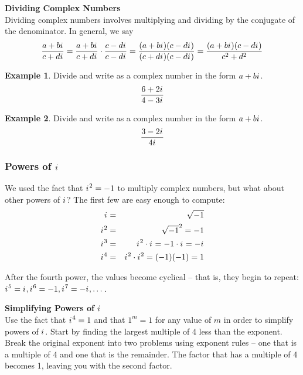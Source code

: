 \documentclass[addpoints,12pt]{exam}
\theoremstyle{definition}
\newtheorem{example}{Example}[subsection]
\newcommand{\iu}{{i\mkern1mu}}
\begin{document}
\begin{mdframed}
\textbf{Dividing Complex Numbers}\mbox{}\\
Dividing complex numbers involves multiplying and dividing by the conjugate of the denominator. In general, we say \[\dfrac{a + b\iu}{c + d\iu} = \dfrac{a + b\iu}{c + d\iu}\cdot \dfrac{c - d\iu}{c - d\iu} = \dfrac{(a+b\iu)(c-d\iu)}{(c+d\iu)(c-d\iu)} = \dfrac{(a+b\iu)(c-d\iu)}{c^2+d^2}\]
\end{mdframed}

\begin{example}
Divide and write as a complex number in the form $a + b\iu$.
\[\dfrac{6+2\iu}{4-3\iu}\]
\vspace{2in}
\end{example}

\newpage

\begin{example}
Divide and write as a complex number in the form $a + b\iu$.
\[\dfrac{3-2\iu}{4\iu}\]
\vspace{1.5in}
\end{example}

\subsubsection*{Powers of $\iu$}
We used the fact that $\iu^2 = -1$ to multiply complex numbers, but what about other powers of $\iu$? The first few are easy enough to compute:
\begin{eqnarray*}
\iu &=& \sqrt{-1}\\
\iu^2 &=& \sqrt{-1}^2 = -1\\
\iu^3 &=& \iu^2\cdot\iu = -1\cdot\iu = -\iu\\
\iu^4 &=& \iu^2\cdot\iu^2 = (-1)(-1) = 1
\end{eqnarray*}

After the fourth power, the values become cyclical -- that is, they begin to repeat: $\iu^5 = \iu, \iu^6 = -1, \iu^7 = -\iu, \dots$.

\vspace{.2in}

\begin{mdframed}
\textbf{Simplifying Powers of $\iu$}\mbox{}\\
Use the fact that $\iu^4 = 1$ and that $1^m = 1$ for any value of $m$ in order to simplify powers of $\iu$. Start by finding the largest multiple of 4 less than the exponent. Break the original exponent into two problems using exponent rules -- one that is a multiple of 4 and one that is the remainder. The factor that has a multiple of 4 becomes 1, leaving you with the second factor.
\end{mdframed}
\end{document}
